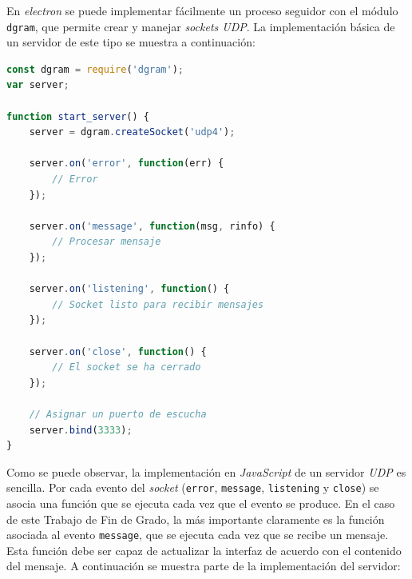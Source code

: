 En \textit{electron} se puede implementar fácilmente un proceso seguidor con el módulo \texttt{dgram}, que permite crear y manejar \textit{sockets UDP}. La implementación básica de un servidor de este tipo se muestra a continuación:


\begin{lstlisting}[language=JavaScript]
const dgram = require('dgram');
var server;

function start_server() {
    server = dgram.createSocket('udp4');

    server.on('error', function(err) {
        // Error
    });

    server.on('message', function(msg, rinfo) {
    	// Procesar mensaje
    });

    server.on('listening', function() {
        // Socket listo para recibir mensajes
    });

    server.on('close', function() {
        // El socket se ha cerrado
    });
    
    // Asignar un puerto de escucha
    server.bind(3333);
}
\end{lstlisting}

Como se puede observar, la implementación en \textit{JavaScript} de un servidor \textit{UDP} es sencilla. Por cada evento del \textit{socket} (\texttt{error}, \texttt{message}, \texttt{listening} y \texttt{close}) se asocia una función que se ejecuta cada vez que el evento se produce. En el caso de este Trabajo de Fin de Grado, la más importante claramente es la función asociada al evento \texttt{message}, que se ejecuta cada vez que se recibe un mensaje. Esta función debe ser capaz de actualizar la interfaz de acuerdo con el contenido del mensaje. A continuación se muestra parte de la implementación del servidor:

